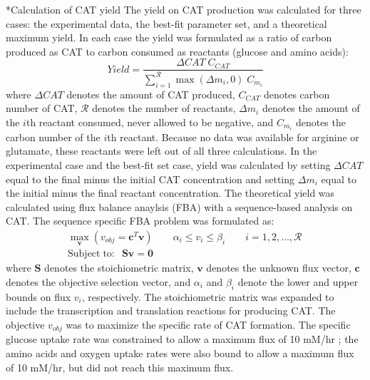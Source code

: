 \documentclass[12pt]{article}
\makeatletter
\renewcommand\subsection{\@startsection
	{subsection}{2}{0mm}
	{-0.05in}
	{-0.5\baselineskip}
	{\normalfont\normalsize\bfseries}}
\makeatother
\begin{document}
\subsection*{Calculation of CAT yield}
The yield on CAT production was calculated for three cases: the experimental data, the best-fit parameter set, and a theoretical maximum yield.
In each case the yield was formulated as a ratio of carbon produced as CAT to carbon consumed as reactants (glucose and amino acids):
\begin{equation}\label{eqn:yield-definition}
	Yield=\frac{\Delta CAT\;C_{CAT}}{\sum_{i=1}^{\mathcal{R}}\max(\Delta m_{i},0)\;C_{m_i}}
\end{equation}
where $\Delta CAT$ denotes the amount of CAT produced, $C_{CAT}$ denotes carbon number of CAT, $\mathcal{R}$ denotes the number of reactants, $\Delta m_{i}$ denotes the amount of the $i$th reactant consumed, never allowed to be negative, and $C_{m_i}$ denotes the carbon number of the $i$th reactant.
Because no data was available for arginine or glutamate, these reactants were left out of all three calculations.
In the experimental case and the best-fit set case, yield was calculated by setting $\Delta CAT$ equal to the final minus the initial CAT concentration and setting $\Delta m_{i}$ equal to the initial minus the final reactant concentration.
The theoretical yield was calculated using flux balance anaylsis (FBA) with a sequence-based analysis on CAT.
The sequence specific FBA \cite{2002_allen_palsson} problem was formulated as:
\begin{equation}\label{eqn:FBA}
\begin{split}
	\max_{\boldsymbol{v}}{} \! \left( v_{obj}=\mathbf{\boldsymbol{c}}^T \boldsymbol{v} \right) \qquad \alpha_i \leq v_i \leq \beta_i  \qquad i=1,2,\hdots,\mathcal{R} \\
	\mathrm{Subject \; to:}	\; \; \mathbf{S}\mathbf{v}=\mathbf{0}\qquad\qquad\qquad\qquad\qquad\qquad\qquad\quad
\end{split}
\end{equation}
where $\mathbf{S}$ denotes the stoichiometric matrix, $\mathbf{v}$ denotes the unknown flux vector, $\boldsymbol{c}$ denotes the objective selection vector, and $\alpha_i$ and $\beta_i$ denote the lower and upper bounds on flux $v_{i}$, respectively.
The stoichiometric matrix was expanded to include the transcription and translation reactions for producing CAT.
The objective $v_{obj}$ was to maximize the specific rate of CAT formation.
The specific glucose uptake rate was constrained to allow a maximum flux of 10 mM/hr \cite{2002_Mahadevan_BiophysJ}; the amino acids and oxygen uptake rates were also bound to allow a maximum flux of 10 mM/hr, but did not reach this maximum flux.
\end{document}

